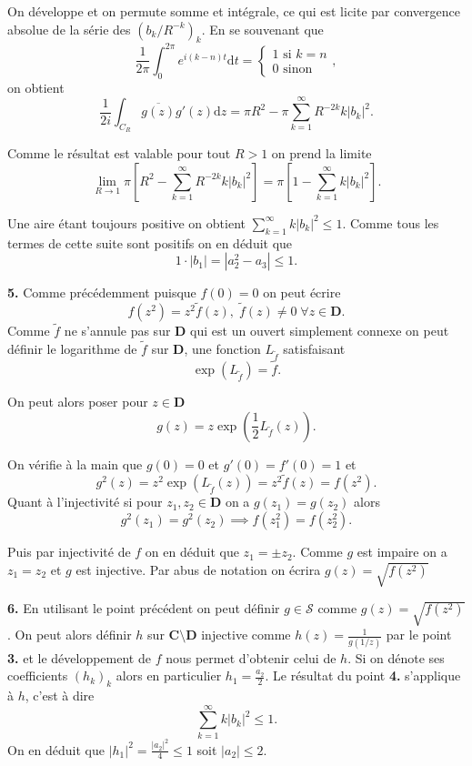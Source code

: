 \documentclass[12pt]{article}
\newcommand{\C}{\mathbf{C}}
\newcommand{\de}{\mathrm{d}}
\begin{document}
On développe et on permute somme et intégrale, ce qui est licite par convergence absolue de la série des $(b_{k}/R^{-k})_{k}$. En se souvenant que \[
        \frac{1}{2\pi}\int_{0}^{2\pi} e^{i(k-n)t}\de t = \begin{cases}
                1 \text{ si } k = n \\
                0 \text{ sinon }
        \end{cases}
,\] on obtient \[
\frac{1}{2i}\int_{C_{R}} \overline{g(z)}g'(z)\de z = \pi R^{2} - \pi\sum_{k=1}^{\infty} R^{-2k}k|b_{k}|^{2}
.\] 

Comme le résultat est valable pour tout $R > 1$ on prend la limite  \[
        \lim_{R\to 1} \pi[ R^{2} - \sum_{k=1}^{\infty} R^{-2k}k|b_{k}|^{2} ] = \pi[1 - \sum_{k=1}^{\infty}k|b_{k}|^{2}] 
.\] 

Une aire étant toujours positive on obtient $\sum_{k=1}^{\infty}k|b_{k}|^{2} \le 1$. Comme tous les termes de cette suite sont positifs on en déduit que \[
        1\cdot |b_1| = |a_{2}^{2}-a_{3}| \le 1
.\]  

 \bigskip

 \textbf{5.} Comme précédemment puisque $f(0) = 0$ on peut écrire \[
         f(z^{2}) = z^{2}\tilde{f}(z), \; \tilde{f}(z) \neq 0 \; \forall z \in \mathbf{D}
 .\] 
 Comme $\tilde{f}$ ne s'annule pas sur $\mathbf{D}$ qui est un ouvert simplement connexe on peut définir le logarithme de $\tilde{f}$ sur $\mathbf{D}$, une fonction $L_{\tilde{f}}$ satisfaisant  \[
         \exp(L_{\tilde{f}}) = \tilde{f}
 .\]

 On peut alors poser pour $z \in \mathbf{D}$ \[
         g(z) = z\exp(\frac{1}{2}L_{\tilde{f}}(z))
 .\] 

 On vérifie à la main que $g(0) = 0$ et $g'(0) = f'(0) = 1$ et
 \[
 g^{2}(z) = z^{2}\exp(L_{\tilde{f}}(z)) = z^{2}\tilde{f}(z) = f(z^{2})
 .\]
Quant à l'injectivité si pour $z_1, z_2 \in \mathbf{D}$ on a $g(z_1) = g(z_2)$ alors \[
         g^{2}(z_1) = g^{2}(z_2) \implies f(z_1^{2}) = f(z_2^{2})
 .\] 

 Puis par injectivité de $f$ on en déduit que $z_1 = \pm z_2$. Comme $g$ est impaire on a $z_1=z_2$ et $g$ est injective.
 Par abus de notation on écrira $g(z) = \sqrt{f(z^{2})}$

 \bigskip

 \textbf{6.} En utilisant le point précédent on peut définir $g \in \mathcal{S}$ comme $g(z) = \sqrt{f(z^{2})}$. On peut alors définir $h$ sur  $\C \setminus \mathbf{D}$ injective comme $h(z) = \frac{1}{g(1/z)}$ par le point \textbf{3.} et le développement de $f$ nous permet d'obtenir celui de $h$. Si on dénote ses coefficients $(h_{k})_{k}$ alors en particulier $h_{1} = \frac{a_{2}}{2}$. Le résultat du point \textbf{4.} s'applique à $h$, c'est à dire  \[
 \sum_{k=1}^{\infty} k|b_{k}|^{2} \le 1
 .\]  
 On en déduit que $|h_{1}|^{2} = \frac{|a_{2}|^{2}}{4} \le 1$ soit $|a_{2}| \le 2$.
\end{document}
